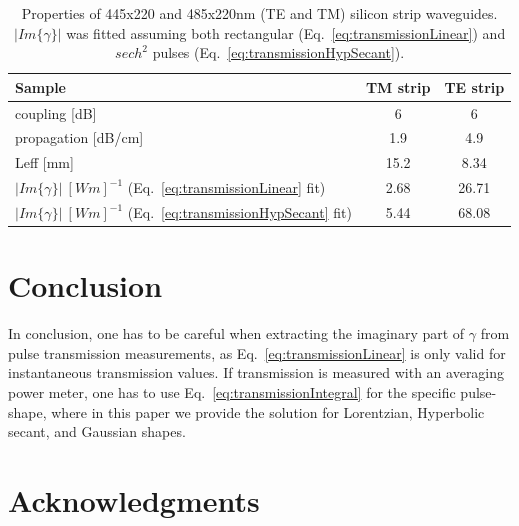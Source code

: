 \documentclass[10pt,letterpaper]{article}
\begin{document}
\begin{table}
\centering
\caption{Properties of 445x220 and 485x220nm (TE and TM) silicon strip waveguides. $|Im\{\gamma\}|$ was fitted assuming both rectangular (Eq.~\ref{eq:transmissionLinear}) and $ sech^2 $  pulses (Eq.~\ref{eq:transmissionHypSecant}).}
\begin{tabular}{l|cc}
\hline
Sample  & TM strip & TE strip\\\hline
coupling [dB] & 6 & 6\\
propagation [dB/cm]  & 1.9 & 4.9\\
Leff [mm]  & 15.2 & 8.34\\
$|Im\{\gamma\}| ~ [Wm]^{-1} $  (Eq.~\ref{eq:transmissionLinear} fit) & 2.68 & 26.71\\
$|Im\{\gamma\}| ~ [Wm]^{-1}$  (Eq.~\ref{eq:transmissionHypSecant} fit)  &  5.44 & 68.08\\
 \hline
\end{tabular}
\label{table:results}
\end{table}



\section{Conclusion}
In conclusion, one has to be careful when extracting the imaginary part of $ \gamma $ from pulse transmission measurements, as Eq.~\ref{eq:transmissionLinear} is only valid for instantaneous transmission values. If transmission is measured with an averaging power meter, one has to use Eq.~\ref{eq:transmissionIntegral} for the specific pulse-shape, where in this paper we provide the solution for Lorentzian, Hyperbolic secant, and Gaussian shapes.




\section*{Acknowledgments}
\end{document}
